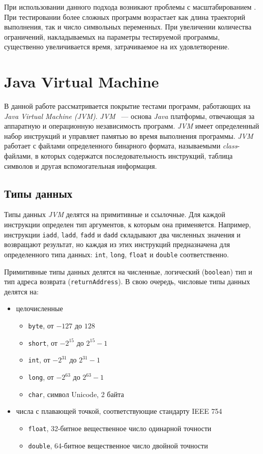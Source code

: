 При использовании данного подхода возникают проблемы с масштабированием \cite{symbolic_limitations}. При тестировании более сложных программ возрастает как 
длина траекторий выполнения, так и число символьных переменных. При увеличении количества ограничений, накладываемых на параметры тестируемой программы, 
существенно увеличивается время, затрачиваемое на их удовлетворение.

\section{Java Virtual Machine}

В данной работе рассматривается покрытие тестами программ, работающих на \textit{Java Virtual Machine (JVM)}. \textit{JVM}~\cite{jvm_spec} 
--- основа \textit{Java} платформы, отвечающая за аппаратную и операционную независимость программ. \textit{JVM} имеет определенный набор инструкций и 
управляет памятью во время выполнения программы. \textit{JVM} работает с файлами определенного бинарного формата, называемыми \textit{class}-файлами, в которых 
содержатся последовательность инструкций, таблица символов и другая вспомогательная информация.

\subsection{Типы данных}
Типы данных \textit{JVM} делятся на примитивные и ссылочные. Для каждой инструкции определен тип аргументов, к которым она применяется. Например, инструкции 
\texttt{iadd}, \texttt{ladd}, \texttt{fadd} и \texttt{dadd} складывают два численных значения и возвращают результат, но каждая из этих инструкций 
предназначена для определенного типа данных: \texttt{int}, \texttt{long}, \texttt{float} и \texttt{double} соответственно.

Примитивные типы данных делятся на численные, логический (\texttt{boolean}) тип и тип адреса возврата (\texttt{returnAddress}). В свою очередь, числовые типы 
данных делятся на:
\begin{itemize}
 \item целочисленные
 \begin{itemize}
  \item \texttt{byte}, от $-127$ до $128$
  \item \texttt{short}, от $-2^{15}$ до $2^{15} - 1$
  \item \texttt{int}, от $-2^{31}$ до $2^{31} - 1$
  \item \texttt{long}, от $-2^{63}$ до $2^{63} - 1$
  \item \texttt{char}, символ Unicode, 2 байта
 \end{itemize}
 \item числа с плавающей точкой, соответствующие стандарту IEEE 754
 \begin{itemize}
  \item \texttt{float}, 32-битное вещественное число одинарной точности
  \item \texttt{double}, 64-битное вещественное число двойной точности
 \end{itemize}
\end{itemize}

